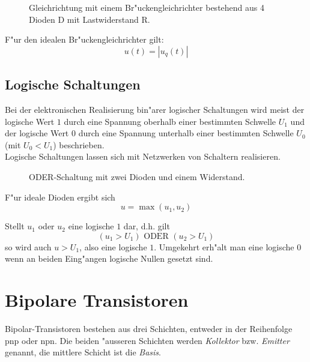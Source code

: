 \documentclass[german, 10pt, a4paper, headsepline]{scrreprt}
\theoremstyle{remark}
\begin{document}
\begin{figure}[hbt]
 
 \centerline{\box\graph}
 \caption{Gleichrichtung mit einem Br"uckengleichrichter bestehend aus 4 Dioden D mit Lastwiderstand R.}
 \label{brueckengleichrichter}
\end{figure}

F"ur den idealen Br"uckengleichrichter gilt:
\begin{displaymath}
	u(t) = |u_q(t)|
\end{displaymath}

\subsection{Logische Schaltungen}

Bei der elektronischen Realisierung bin"arer logischer Schaltungen wird meist der logische Wert $1$ durch eine Spannung oberhalb einer bestimmten Schwelle $U_1$ und der logische Wert $0$ durch eine Spannung unterhalb einer bestimmten Schwelle $U_0$ (mit $U_0 < U_1$) beschrieben.\\

Logische Schaltungen lassen sich mit Netzwerken von Schaltern realisieren.

\begin{figure}[hbt]
 
 \centerline{\box\graph}
 \caption{ODER-Schaltung mit zwei Dioden und einem Widerstand.}
 \label{oder_schaltung}
\end{figure}

F"ur ideale Dioden ergibt sich
\begin{displaymath}
	u = \max(u_1,u_2)
\end{displaymath}

Stellt $u_1$ oder $u_2$ eine logische $1$ dar, d.h. gilt
\begin{displaymath}
	(u_1 > U_1) \mbox{ ODER } (u_2 > U_1)
\end{displaymath}
so wird auch $u > U_1$, also eine logische $1$. Umgekehrt erh"alt man eine logische $0$ wenn an beiden Eing"angen logische Nullen gesetzt sind.

\section{Bipolare Transistoren}

Bipolar-Transistoren bestehen aus drei Schichten, entweder in der Reihenfolge pnp oder npn. Die beiden "ausseren Schichten werden \textit{Kollektor} bzw. \textit{Emitter} genannt, die mittlere Schicht ist die \textit{Basis}.
\end{document}
